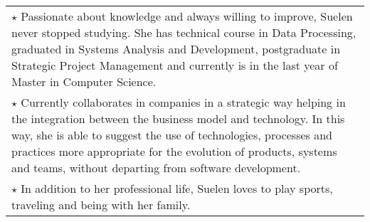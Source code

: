 \documentclass[a4paper, oneside, final]{scrartcl}
\newcommand{\vspc}{\vspace{0.15cm}} %
\begin{document}
\begin{center}
\begin{tabularx}{1\linewidth}{X}
$\star$ Passionate about knowledge and always willing to improve, Suelen never stopped studying. She has technical course in Data Processing, graduated in Systems Analysis and Development, postgraduate in Strategic Project Management and currently is in the last year of Master in Computer Science. \vspc\\

$\star$ Currently collaborates in companies in a strategic way helping in the integration between the business model and technology. In this way, she is able to suggest the use of technologies, processes and practices more appropriate for the evolution of products, systems and teams, without departing from software development. \vspc\\

$\star$ In addition to her professional life, Suelen loves to play sports, traveling and being with her family. \vspc\\







\end{tabularx}



\end{center}
\end{document}
